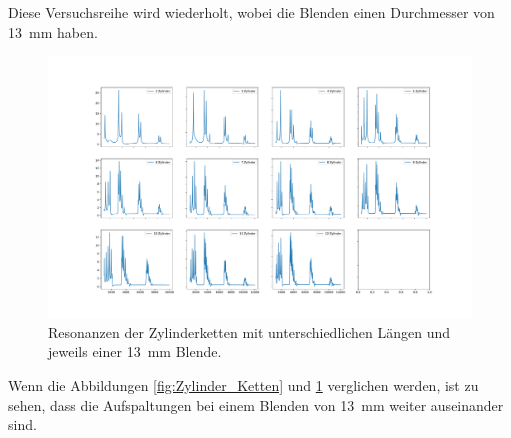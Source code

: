 Diese Versuchsreihe wird wiederholt, wobei die Blenden einen Durchmesser von \SI{13}{\milli\meter} haben.
\FloatBarrier
\begin{figure}
    \centering
    \includegraphics[width=\textwidth,keepaspectratio]{figure/Zylinder_Ketten_13mm.pdf}
    \caption{Resonanzen der Zylinderketten mit unterschiedlichen Längen und jeweils einer \SI{13}{\milli\meter} Blende.}
    \label{fig:Zylinder_Ketten_13}
\end{figure}
\FloatBarrier
Wenn die Abbildungen \ref{fig:Zylinder_Ketten} und \ref{fig:Zylinder_Ketten_13} verglichen werden, ist zu sehen, dass die Aufspaltungen 
bei einem Blenden von \SI{13}{\milli\meter} weiter auseinander sind.
